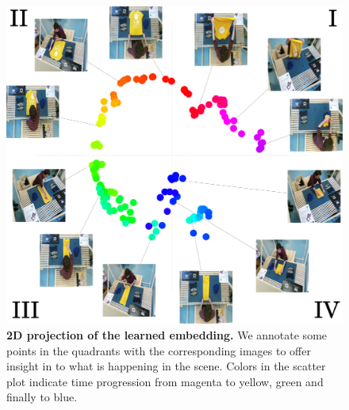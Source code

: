 \documentclass[\home/main.tex]{subfiles}
\begin{document}
\begin{figure}[!htbp]
    \centering
    \includegraphics[width=\textwidth, keepaspectratio]{figures/figs_discussion_umap_111.jpg}
    \caption[2D projection of the learned TCN embedding]{\textbf{2D projection of the learned embedding.} We annotate some points in the quadrants with the corresponding images to offer insight in to what is happening in the scene. Colors in the scatter plot indicate time progression from magenta to yellow, green and finally to blue. }
    \label{fig:umap_111}
\end{figure}
\end{document}
